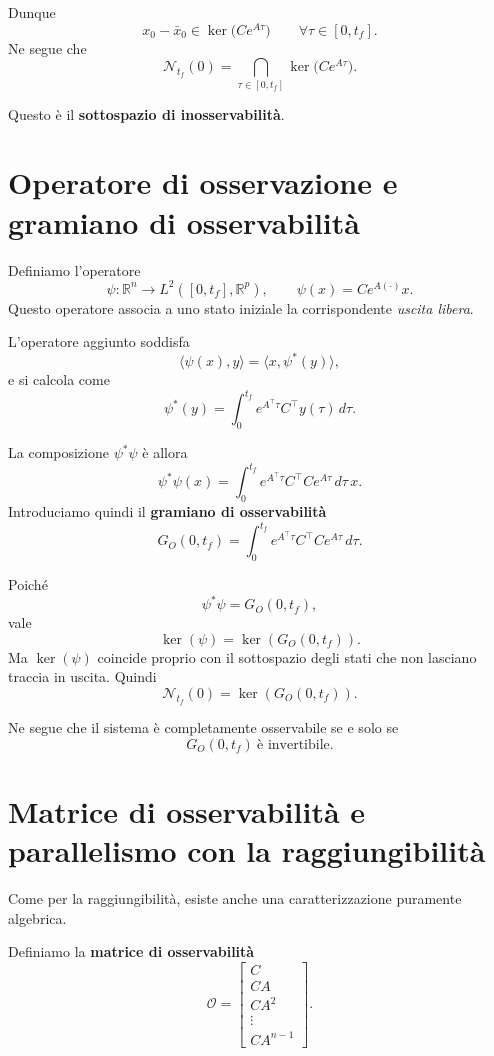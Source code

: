 Dunque
\[
x_0-\bar x_0 \in \ker\!\big(Ce^{A\tau}\big)\qquad \forall \tau\in[0,t_f].
\]
Ne segue che
\begin{equation}
\mathcal N_{t_f}(0)=\bigcap_{\tau\in[0,t_f]} \ker\!\big(Ce^{A\tau}\big).
\label{eq:L14_Ntf}
\end{equation}

Questo è il \textbf{sottospazio di inosservabilità}.

\section{Operatore di osservazione e gramiano di osservabilità}

Definiamo l’operatore
\[
\psi : \mathbb R^n \to L^2([0,t_f],\mathbb R^p),
\qquad
\psi(x)=Ce^{A(\cdot)}x.
\]
Questo operatore associa a uno stato iniziale la corrispondente \emph{uscita libera}.

L’operatore aggiunto soddisfa
\[
\langle \psi(x), y\rangle=\langle x,\psi^\ast(y)\rangle,
\]
e si calcola come
\[
\psi^\ast(y)=\int_0^{t_f} e^{A^\top \tau} C^\top y(\tau)\,d\tau.
\]

La composizione \(\psi^\ast\psi\) è allora
\[
\psi^\ast\psi(x)
=
\int_0^{t_f} e^{A^\top \tau}C^\top C e^{A\tau}\,d\tau \, x.
\]
Introduciamo quindi il \textbf{gramiano di osservabilità}
\begin{equation}
G_O(0,t_f)=\int_0^{t_f} e^{A^\top \tau}C^\top C e^{A\tau}\,d\tau.
\label{eq:L14_gramiano_oss}
\end{equation}

Poiché
\[
\psi^\ast\psi=G_O(0,t_f),
\]
vale
\[
\ker(\psi)=\ker(G_O(0,t_f)).
\]
Ma \(\ker(\psi)\) coincide proprio con il sottospazio degli stati che non lasciano traccia in uscita. Quindi
\[
\boxed{
\mathcal N_{t_f}(0)=\ker(G_O(0,t_f)).
}
\]

Ne segue che il sistema è completamente osservabile se e solo se
\[
G_O(0,t_f)\ \text{è invertibile}.
\]

\section{Matrice di osservabilità e parallelismo con la raggiungibilità}

Come per la raggiungibilità, esiste anche una caratterizzazione puramente algebrica.

Definiamo la \textbf{matrice di osservabilità}
\[
\mathcal O=
\begin{bmatrix}
C\\
CA\\
CA^2\\
\vdots\\
CA^{n-1}
\end{bmatrix}.
\]

